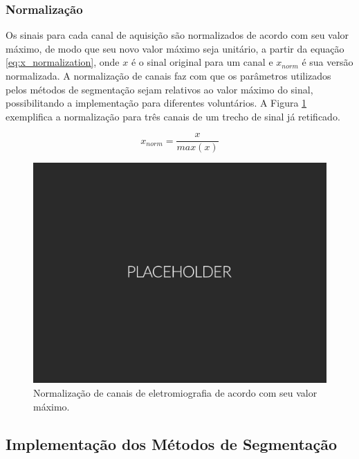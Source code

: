 				\subsubsection{Normalização}
Os sinais para cada canal de aquisição são normalizados de acordo com seu valor máximo, de modo que seu novo valor máximo seja unitário, a partir da equação \ref{eq:x_normalization}, onde $x$ é o sinal original para um canal e $x_{norm}$ é sua versão normalizada. A normalização de canais faz com que os parâmetros utilizados pelos métodos de segmentação sejam relativos ao valor máximo do sinal, possibilitando a implementação para diferentes voluntários. A Figura \ref{fig:normalization} exemplifica a normalização para três canais de um trecho de sinal já retificado.

\begin{equation}
	\label{eq:x_normalization}
	x_{norm} = \frac{x}{max(x)}
\end{equation}

\begin{figure}[htb]
	\caption{\label{fig:normalization}Normalização de canais de eletromiografia de acordo com seu valor máximo.}
	\begin{center}
	    \includegraphics[width=0.75\linewidth]{./img/placeholder.png}
	\end{center}
\end{figure}

			\subsection{Implementação dos Métodos de Segmentação}

